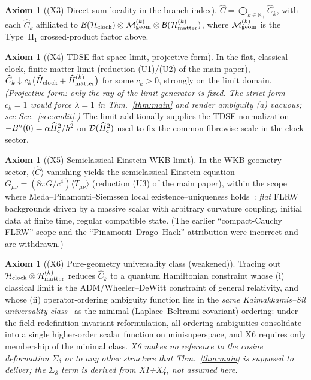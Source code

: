 \documentclass[11pt,a4paper]{article}
\theoremstyle{definition}
\newtheorem{axiom}[theorem]{Axiom}
\theoremstyle{remark}
\newcommand{\HH}{\mathcal{H}}
\newcommand{\MM}{\mathcal{M}}
\newcommand{\KK}{\mathbb{K}}
\begin{document}
\begin{axiom}[(X3) Direct-sum locality in the branch
index]\label{ax:X3}
$\widehat C=\bigoplus_{k\in\KK_+}\widehat C_k$, with each
$\widehat C_k$ affiliated to $\mathcal B(\HH_{\rm clock})
\otimes\MM_{\rm geom}^{(k)}\otimes\mathcal B(\HH_{\rm matter}
^{(k)})$, where $\MM_{\rm geom}^{(k)}$ is the Type~II$_1$
crossed-product factor above.
\end{axiom}

\begin{axiom}[(X4) TDSE flat-space limit, projective
form]\label{ax:X4}
In the flat, classical-clock, finite-matter limit (reduction
(U1)/(U2) of the main paper), $\widehat C_k\downarrow
c_k\bigl(\widehat H_{\rm clock}+\widehat H_{\rm matter}^{(k)}
\bigr)$ for some $c_k>0$, strongly on the limit domain.
\emph{(Projective form: only the ray of the limit generator is
fixed. The strict form $c_k=1$ would force $\lambda=1$ in
Thm.~\ref{thm:main} and render ambiguity (a) vacuous; see
Sec.~\ref{sec:audit}.)} The limit additionally supplies the
TDSE normalization $-B''(0)=\alpha\widehat H_{\rm c}^2/\hbar^2$
on $\mathcal D(\widehat H_{\rm c}^2)$ used to fix the common
fibrewise scale in the clock sector.
\end{axiom}

\begin{axiom}[(X5) Semiclassical-Einstein WKB
limit]\label{ax:X5}
In the WKB-geometry sector, $\langle\widehat C\rangle$-vanishing
yields the semiclassical Einstein equation
$G_{\mu\nu}=(8\pi G/c^4)\langle T_{\mu\nu}\rangle$ (reduction
(U3) of the main paper), within the scope where
Meda--Pinamonti--Siemssen local existence--uniqueness
holds~\cite{MedaPinamontiSiemssen2020}: \emph{flat} FLRW
backgrounds driven by a massive scalar with arbitrary curvature
coupling, initial data at finite time, regular compatible
state. (The earlier ``compact-Cauchy FLRW'' scope and the
``Pinamonti--Drago--Hack'' attribution were incorrect and are
withdrawn.)
\end{axiom}

\begin{axiom}[(X6) Pure-geometry universality class
(weakened)]\label{ax:X6}
Tracing out $\HH_{\rm clock}\otimes\HH_{\rm matter}^{(k)}$
reduces $\widehat C_k$ to a quantum Hamiltonian constraint
whose (i) classical limit is the ADM/Wheeler--DeWitt constraint
of general relativity, and whose (ii) operator-ordering
ambiguity function lies in the \emph{same Kaimakkamis--Sil
universality class}~\cite{KaimakkamisSil2024} as the minimal
(Laplace--Beltrami-covariant) ordering: under the
field-redefinition-invariant reformulation, all ordering
ambiguities consolidate into a single higher-order scalar
function on minisuperspace, and X6 requires only membership of
the minimal class. \emph{X6 makes no reference to the cosine
deformation $\widehat\Sigma_\delta$ or to any other structure
that Thm.~\ref{thm:main} is supposed to deliver; the
$\Sigma_\delta$ term is derived from X1+X4, not assumed here.}
\end{axiom}
\end{document}
